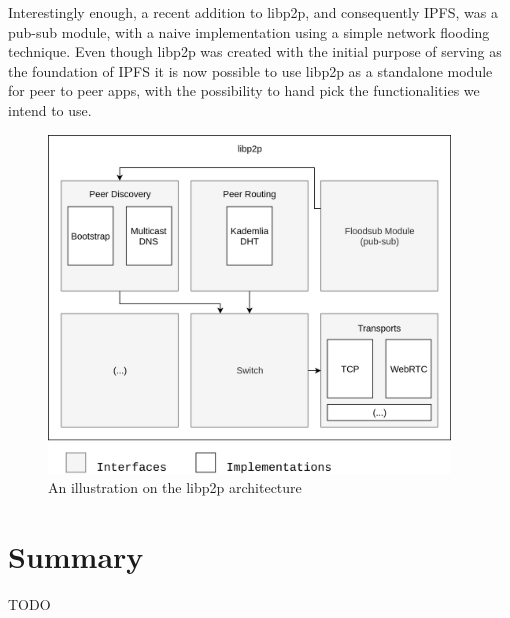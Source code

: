 Interestingly enough, a recent addition to libp2p, and consequently IPFS, was a
pub-sub module, with a naive implementation using a simple network flooding
technique. Even though libp2p was created with the initial purpose of serving
as the foundation of IPFS it is now possible to use libp2p as a standalone
module for peer to peer apps, with the possibility to hand pick the
functionalities we intend to use.

\begin{figure}[hb!]
  \centering
  \includegraphics[width=0.95\textwidth]{img/libp2p-arch.png}
  \caption{An illustration on the libp2p architecture}
  \label{fig:ipfs-arch}
\end{figure}

\section{Summary}\label{summary}

TODO

